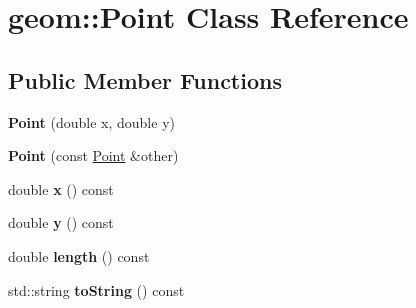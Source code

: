 \hypertarget{classgeom_1_1Point}{}\section{geom\+:\+:Point Class Reference}
\label{classgeom_1_1Point}
\subsection*{Public Member Functions}
\begin{DoxyCompactItemize}
\item 
{\bfseries Point} (double x, double y)\hypertarget{classgeom_1_1Point_a6031afce8ce4227b31d127985eff0007}{}\label{classgeom_1_1Point_a6031afce8ce4227b31d127985eff0007}

\item 
{\bfseries Point} (const \hyperlink{classgeom_1_1Point}{Point} \&other)\hypertarget{classgeom_1_1Point_a18482468103c33ebcdb9698dcf91575b}{}\label{classgeom_1_1Point_a18482468103c33ebcdb9698dcf91575b}

\item 
double {\bfseries x} () const \hypertarget{classgeom_1_1Point_a3c5dbb0ebeeee81621e7793db8eaa263}{}\label{classgeom_1_1Point_a3c5dbb0ebeeee81621e7793db8eaa263}

\item 
double {\bfseries y} () const \hypertarget{classgeom_1_1Point_ac432f0d078bd76d793a92693ed838c14}{}\label{classgeom_1_1Point_ac432f0d078bd76d793a92693ed838c14}

\item 
double {\bfseries length} () const \hypertarget{classgeom_1_1Point_ad48a1dd59de4f63b17015220a067e261}{}\label{classgeom_1_1Point_ad48a1dd59de4f63b17015220a067e261}

\item 
std\+::string {\bfseries to\+String} () const \hypertarget{classgeom_1_1Point_a95bea77ee4e0ad97ae82a737e00f4a5b}{}\label{classgeom_1_1Point_a95bea77ee4e0ad97ae82a737e00f4a5b}

\end{DoxyCompactItemize}
